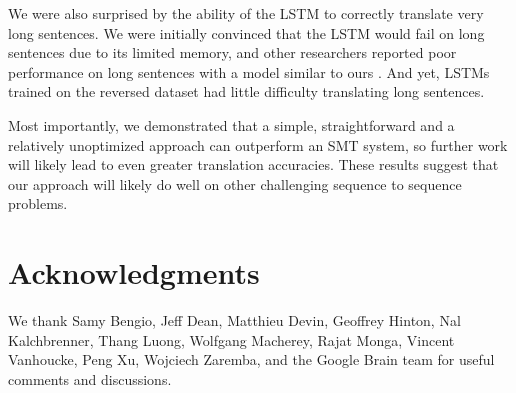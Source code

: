 \documentclass{article} \usepackage{nips14submit_e}
\begin{document}
We were also surprised by the ability of the LSTM to correctly
translate very long sentences.  We were initially convinced that the
LSTM would fail on long sentences due to its limited memory, and other
researchers reported poor performance on long sentences with a model
similar to ours \cite{cho14,bog14,curse}.  And yet,
LSTMs trained on the reversed dataset had little difficulty translating long
sentences.

Most importantly, we demonstrated that a simple, straightforward and a
relatively unoptimized approach can outperform an SMT system, so
further work will likely lead to even greater translation accuracies.  
These results suggest that our approach will likely   
do well on other challenging sequence to sequence problems.
 


\small
\section{Acknowledgments}

We thank Samy Bengio, Jeff Dean, Matthieu Devin, Geoffrey Hinton, Nal Kalchbrenner, Thang Luong, Wolfgang
Macherey, Rajat Monga, Vincent Vanhoucke, Peng Xu, Wojciech Zaremba,
and the Google Brain team for useful comments and discussions.


 

\end{document}
